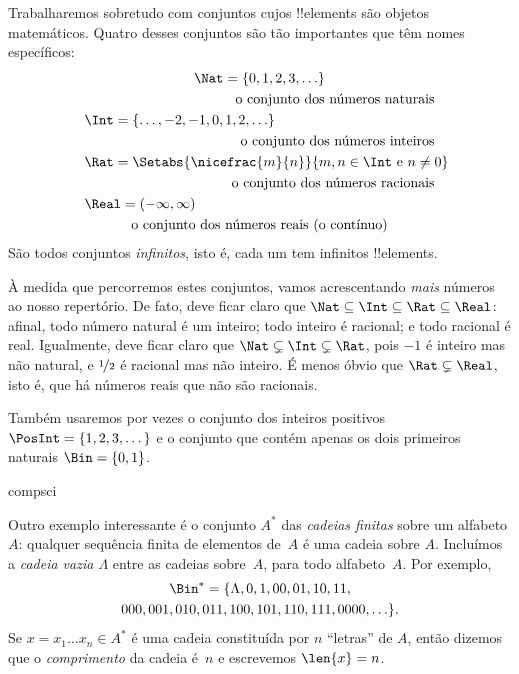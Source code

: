 \documentclass[../../../include/open-logic-section]{subfiles}
\begin{document}

\begin{ex}
Trabalharemos sobretudo com conjuntos cujos !!{element}s são
objetos matemáticos. Quatro desses conjuntos são tão importantes que têm
nomes específicos:
\begin{multline*}
    \Nat = \{0, 1, 2, 3, \ldots\} \\
    \shoveright{\text{o conjunto dos números naturais}}\\
    \shoveleft{\Int = \{\ldots, -2, -1, 0, 1, 2, \ldots\}} \\
    \shoveright{\text{o conjunto dos números inteiros}}\\
    \shoveleft{\Rat = \Setabs{\nicefrac{m}{n}}{m, n \in \Int\text{ e }n \neq 0}}\\
    \shoveright{\text{o conjunto dos números racionais}}\\
    \shoveleft{\Real = (-\infty, \infty)}\\
    \text{o conjunto dos números reais (o contínuo)}
\end{multline*}
São todos conjuntos \emph{infinitos}, isto é, cada um tem
infinitos !!{element}s.

À medida que percorremos estes conjuntos, vamos acrescentando \emph{mais} números ao
nosso repertório. De fato, deve ficar claro que $\Nat \subseteq \Int
\subseteq \Rat \subseteq \Real$: afinal, todo número natural é um
inteiro; todo inteiro é racional; e todo racional é real.
Igualmente, deve ficar claro que $\Nat \subsetneq \Int \subsetneq
\Rat$, pois $-1$ é inteiro mas não natural, e
$\nicefrac{1}{2}$ é racional mas não inteiro. É menos óbvio
que $\Rat \subsetneq \Real$, isto é, que há números reais
que não são racionais. 

Também usaremos por vezes o conjunto dos inteiros positivos $\PosInt = \{1,
2, 3, \dots\}$ e o conjunto que contém apenas os dois primeiros naturais
$\Bin = \{0, 1\}$.
\end{ex}

\begin{tagblock}{compsci}
\begin{ex}[Cadeias] 
Outro exemplo interessante é o conjunto $A^{*}$ das \emph{cadeias finitas}
sobre um alfabeto $A$: qualquer sequência finita de elementos de~$A$
é uma cadeia sobre $A$. Incluímos a \emph{cadeia vazia $\Lambda$}
entre as cadeias sobre~$A$, para todo alfabeto~$A$. Por exemplo,
\begin{multline*}
\Bin^*
=\{\Lambda,0,1,00,01,10,11,\\
000,001,010,011,100,101,110,111,0000,\ldots\}.
\end{multline*}
Se $x=x_{1}\ldots x_{n}\in A^{*}$ é uma cadeia constituída por $n$
``letras'' de $A$, então dizemos que o \emph{comprimento} da cadeia é~$n$
e escrevemos $\len{x}=n$.
\end{ex}
\end{tagblock}
\end{document}
